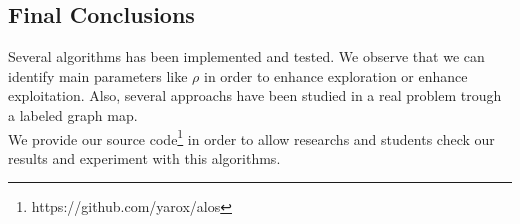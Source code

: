 \newpage
\subsection{Final Conclusions}

Several algorithms has been implemented and tested. We observe that we can identify main parameters like $\rho$ in order to enhance exploration or enhance exploitation. Also, several approachs have been studied in a real problem trough a labeled graph map. 
\\
We provide our source code\footnote{https://github.com/yarox/alos} in order to allow researchs and students check our results and experiment with this algorithms.